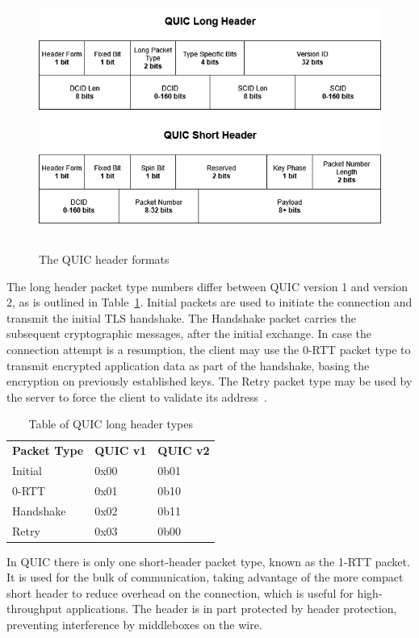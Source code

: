 \documentclass[english, 12pt, a4paper, elec, utf8, a-2b, online]{aaltothesis}
\begin{document}
\begin{figure}[h]
	\centering
	\includegraphics[alt={A block diagram of the QUIC short and long header format, detailing its fields and their sizes.}, height=8cm]{./images/quic_header.png}
	\caption{The QUIC header formats}
	\label{fig:quic_header}
\end{figure}

The long header packet type numbers differ between QUIC version 1 and version 2, as
is outlined in Table~\ref{tab:quic_long_header_types}. Initial packets are used to initiate the connection and transmit
the initial TLS handshake. The Handshake packet carries the subsequent
cryptographic messages, after the initial exchange. In case the connection attempt is
a resumption, the client may use the 0-RTT packet type to transmit encrypted application
data as part of the handshake, basing the encryption on previously established keys. The
Retry packet type may be used by the server to force the client to
validate its address~\cite{rfc9000}.

\begin{table}[h]
	\centering
	\caption{Table of QUIC long header types}
	\label{tab:quic_long_header_types}
	\begin{tabular}{lll}
	\textbf{Packet Type}		  & \textbf{QUIC v1} & \textbf{QUIC v2} \\
	Initial   & 0x00    & 0b01    \\
	0-RTT     & 0x01    & 0b10    \\
	Handshake & 0x02    & 0b11    \\
	Retry     & 0x03    & 0b00   
	\end{tabular}
\end{table}

In QUIC there is only one short-header packet type, known as the 1-RTT packet. It is
used for the bulk of communication, taking advantage of the more compact short
header to reduce overhead on the connection, which is useful for high-throughput
applications. The header is in part protected by header protection, preventing
interference by middleboxes on the wire.
\end{document}
